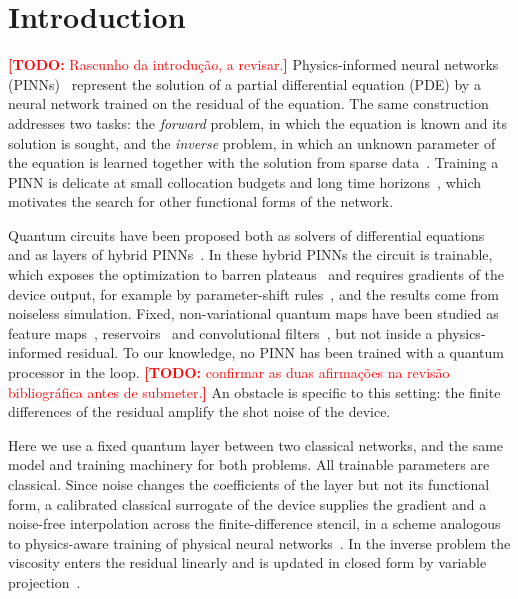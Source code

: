 \documentclass[floatfix,aps,pra,twocolumn,superscriptaddress,10pt,nofootinbib]{revtex4-2}
\newif\ifshowtodos \showtodostrue
\newcommand{\TODO}[1]{\ifshowtodos\textcolor{red}{\textbf{[TODO:} #1\textbf{]}}\fi}
\begin{document}
\section{Introduction}\label{sec:intro}
\TODO{Rascunho da introdu\c{c}\~ao, a revisar.}
Physics-informed neural networks (PINNs)~\cite{raissi2019physics,karniadakis2021physics} represent the solution of a partial differential equation (PDE) by a neural network trained on the residual of the equation. The same construction addresses two tasks: the \emph{forward} problem, in which the equation is known and its solution is sought, and the \emph{inverse} problem, in which an unknown parameter of the equation is learned together with the solution from sparse data~\cite{raissi2019physics}. Training a PINN is delicate at small collocation budgets and long time horizons~\cite{krishnapriyan2021characterizing,wang2021understanding,wang2022when}, which motivates the search for other functional forms of the network.

Quantum circuits have been proposed both as solvers of differential equations~\cite{lubasch2020variational,kyriienko2021solving,paine2023quantum} and as layers of hybrid PINNs~\cite{sedykh2024hybrid,berger2025trainable,farea2025qcpinn,lantigua2026classical,zabihi2026hybrid}. In these hybrid PINNs the circuit is trainable, which exposes the optimization to barren plateaus~\cite{mcclean2018barren,cerezo2021cost} and requires gradients of the device output, for example by parameter-shift rules~\cite{mitarai2018quantum,schuld2019evaluating}, and the results come from noiseless simulation. Fixed, non-variational quantum maps have been studied as feature maps~\cite{havlicek2019supervised}, reservoirs~\cite{fujii2017harnessing,mujal2021opportunities} and convolutional filters~\cite{henderson2020quanvolutional}, but not inside a physics-informed residual. To our knowledge, no PINN has been trained with a quantum processor in the loop. \TODO{confirmar as duas afirma\c{c}\~oes na revis\~ao bibliogr\'afica antes de submeter.} An obstacle is specific to this setting: the finite differences of the residual amplify the shot noise of the device.

Here we use a fixed quantum layer between two classical networks, and the same model and training machinery for both problems. All trainable parameters are classical. Since noise changes the coefficients of the layer but not its functional form, a calibrated classical surrogate of the device supplies the gradient and a noise-free interpolation across the finite-difference stencil, in a scheme analogous to physics-aware training of physical neural networks~\cite{wright2022deep}. In the inverse problem the viscosity enters the residual linearly and is updated in closed form by variable projection~\cite{golub1973differentiation}.
\end{document}
